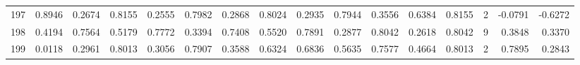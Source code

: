 \begin{tabular}{lrrrrrrrrrrrrrrr}
197 &      0.8946 &  0.2674 &  0.8155 &  0.2555 &  0.7982 &  0.2868 &  0.8024 &  0.2935 &  0.7944 &  0.3556 &   0.6384 &     0.8155 &      2 &                   -0.0791 &                    -0.6272 \\
198 &      0.4194 &  0.7564 &  0.5179 &  0.7772 &  0.3394 &  0.7408 &  0.5520 &  0.7891 &  0.2877 &  0.8042 &   0.2618 &     0.8042 &      9 &                    0.3848 &                     0.3370 \\
199 &      0.0118 &  0.2961 &  0.8013 &  0.3056 &  0.7907 &  0.3588 &  0.6324 &  0.6836 &  0.5635 &  0.7577 &   0.4664 &     0.8013 &      2 &                    0.7895 &                     0.2843 \\
\bottomrule
\end{tabular}
